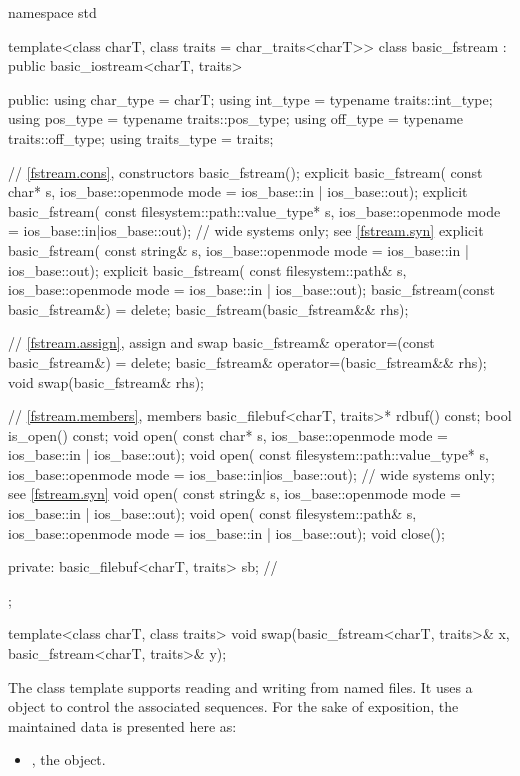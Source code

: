 %
\begin{codeblock}
namespace std {
  template<class charT, class traits = char_traits<charT>>
  class basic_fstream : public basic_iostream<charT, traits> {
  public:
    using char_type   = charT;
    using int_type    = typename traits::int_type;
    using pos_type    = typename traits::pos_type;
    using off_type    = typename traits::off_type;
    using traits_type = traits;

    // \ref{fstream.cons}, constructors
    basic_fstream();
    explicit basic_fstream(
      const char* s,
      ios_base::openmode mode = ios_base::in | ios_base::out);
    explicit basic_fstream(
      const filesystem::path::value_type* s,
      ios_base::openmode mode = ios_base::in|ios_base::out);    // wide systems only; see \ref{fstream.syn}
    explicit basic_fstream(
      const string& s,
      ios_base::openmode mode = ios_base::in | ios_base::out);
    explicit basic_fstream(
      const filesystem::path& s,
      ios_base::openmode mode = ios_base::in | ios_base::out);
    basic_fstream(const basic_fstream&) = delete;
    basic_fstream(basic_fstream&& rhs);

    // \ref{fstream.assign}, assign and swap
    basic_fstream& operator=(const basic_fstream&) = delete;
    basic_fstream& operator=(basic_fstream&& rhs);
    void swap(basic_fstream& rhs);

    // \ref{fstream.members}, members
    basic_filebuf<charT, traits>* rdbuf() const;
    bool is_open() const;
    void open(
      const char* s,
      ios_base::openmode mode = ios_base::in | ios_base::out);
    void open(
      const filesystem::path::value_type* s,
      ios_base::openmode mode = ios_base::in|ios_base::out);    // wide systems only; see \ref{fstream.syn}
    void open(
      const string& s,
      ios_base::openmode mode = ios_base::in | ios_base::out);
    void open(
      const filesystem::path& s,
      ios_base::openmode mode = ios_base::in | ios_base::out);
    void close();

  private:
    basic_filebuf<charT, traits> sb;    // \expos
  };

  template<class charT, class traits>
    void swap(basic_fstream<charT, traits>& x,
              basic_fstream<charT, traits>& y);
}
\end{codeblock}

\pnum
The
class template
supports reading and writing from named files.
It uses a
object to control the associated sequences.
For the sake of exposition, the maintained data is presented here as:
\begin{itemize}
\item
{}, the  object.
\end{itemize}

